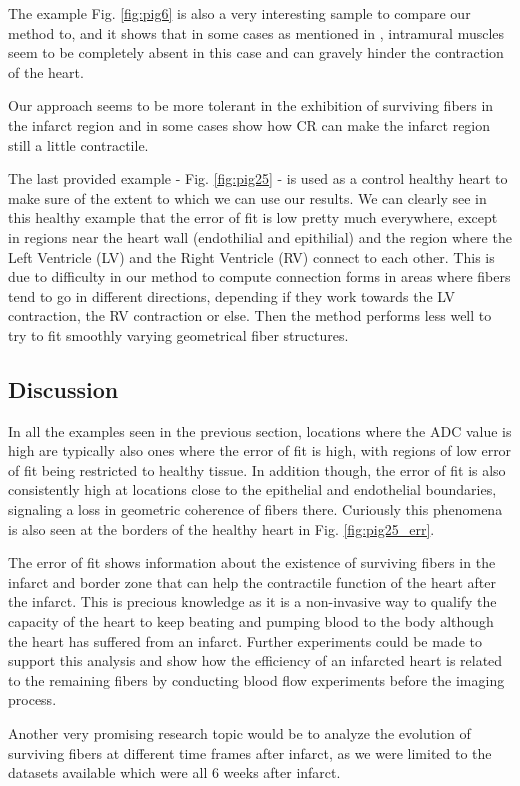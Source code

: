 The example Fig. \ref{fig:pig6} is also a very interesting sample to compare our method to, and it shows that in some cases as mentioned in \cite{ursell1985structural}, intramural muscles seem to be completely absent in this case and can gravely hinder the contraction of the heart.

Our approach seems to be more tolerant in the exhibition of surviving fibers in the infarct region and in some cases show how CR can make the infarct region still a little contractile.

The last provided example - Fig. \ref{fig:pig25} - is used as a control healthy heart to make sure of the extent to which we can use our results. We can clearly see in this healthy example that the error of fit is low pretty much everywhere, except in regions near the heart wall (endothilial and epithilial) and the region where the Left Ventricle (LV) and the Right Ventricle (RV) connect to each other. This is due to difficulty in our method to compute connection forms in areas where fibers tend to go in different directions, depending if they work towards the LV contraction, the RV contraction or else. Then the method performs less well to try to fit smoothly varying geometrical fiber structures.

\subsection{Discussion}

In all the examples seen in the previous section, locations where the ADC value is high are typically also ones where the error of fit is high, with regions of low error of fit being restricted to healthy tissue. In addition though, the error of fit is also consistently high at locations close to the epithelial and endothelial boundaries, signaling a loss in geometric coherence of fibers there. Curiously this phenomena is also seen at the borders of the healthy heart in Fig. \ref{fig:pig25_err}.

The error of fit shows information about the existence of surviving fibers in the infarct and border zone that can help the contractile function of the heart after the infarct. This is precious knowledge as it is a non-invasive way to qualify the capacity of the heart to keep beating and pumping blood to the body although the heart has suffered from an infarct. Further experiments could be made to support this analysis and show how the efficiency of an infarcted heart is related to the remaining fibers by conducting blood flow experiments before the imaging process.

Another very promising research topic would be to analyze the evolution of surviving fibers at different time frames after infarct, as we were limited to the datasets available which were all 6 weeks after infarct.
